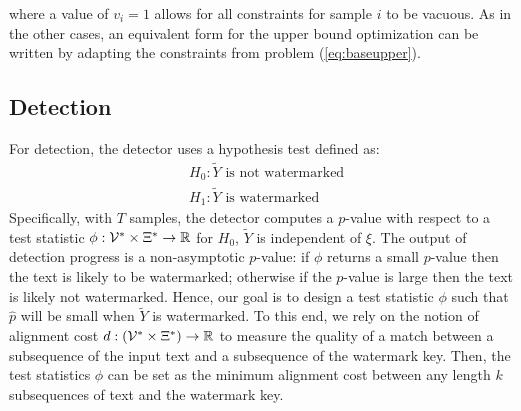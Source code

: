 where a value of $v_i=1$ allows for all constraints for sample $i$ to be vacuous. As in the other cases, an equivalent form for the upper bound optimization can be written by adapting the constraints from problem (\ref{eq:baseupper}).



\subsection{Detection}
%
For detection, the detector uses a hypothesis test defined as:
%
\begin{align}
    &H_0: \widetilde{Y} \text{ is not watermarked} \\
    &H_1: \widetilde{Y} \text{ is watermarked}
    \label{eq:hypothesis-test}
\end{align}
%
Specifically, with $T$ samples, the detector computes a $p$-value with respect to a test statistic $\phi: \mathcal{V}^* \times \Xi^* \rightarrow \mathbb{R}$ for $H_0$, \ie $\widetilde{Y}$ is independent of $\xi$. The output of detection progress is a non-asymptotic $p$-value: if $\phi$ returns a small $p$-value then the text is likely to be watermarked; otherwise if the $p$-value is large then the text is likely not watermarked. Hence, our goal is to design a test statistic $\phi$ such that $\hat{p}$ will be small when $\widetilde{Y}$ is watermarked. To this end, we rely on the notion of alignment cost $d: (\mathcal{V}^* \times \Xi^*) \rightarrow \mathbb{R}$ to measure the quality of a match between a subsequence of the input text and a subsequence of the watermark key. Then, the test statistics $\phi$ can be set as the minimum alignment cost between any length $k$ subsequences of text and the watermark key. 